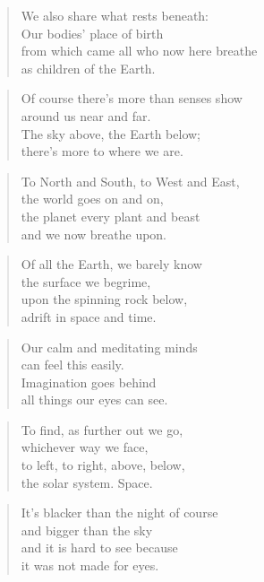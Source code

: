 \documentclass[10pt,a4paper]{article}
\begin{document}
\begin{paracol}{2}
\begin{verse}
We also share what rests beneath:\\
Our bodies’ place of birth\\
from which came all who now here breathe\\
as children of the Earth.
\end{verse}

\begin{verse}
Of course there’s more than senses show\\
around us near and far.\\
The sky above, the Earth below;\\
there’s more to where we are.
\end{verse}

\begin{verse}
To North and South, to West and East,\\
the world goes on and on,\\
the planet every plant and beast\\
and we now breathe upon.
\end{verse}

\begin{verse}
Of all the Earth, we barely know\\
the surface we begrime,\\
upon the spinning rock below,\\
adrift in space and time.
\end{verse}

\begin{verse}
Our calm and meditating minds\\
can feel this easily.\\
Imagination goes behind\\
all things our eyes can see.
\end{verse}

\begin{verse}
To find, as further out we go,\\
whichever way we face,\\
to left, to right, above, below,\\
the solar system. Space.
\end{verse}

\begin{verse}
It’s blacker than the night of course\\
and bigger than the sky\\
and it is hard to see because\\
it was not made for eyes.
\end{verse}


\end{paracol}
\end{document}
